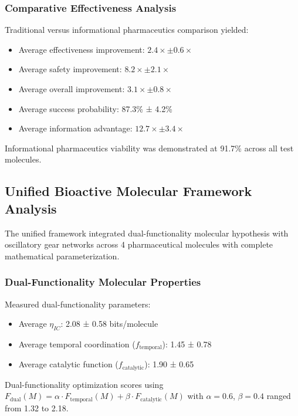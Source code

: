 \documentclass[12pt,a4paper]{article}
\begin{document}
\subsubsection{Comparative Effectiveness Analysis}

Traditional versus informational pharmaceutics comparison yielded:
\begin{itemize}
\item Average effectiveness improvement: $2.4 \times \pm 0.6 \times$
\item Average safety improvement: $8.2 \times \pm 2.1 \times$
\item Average overall improvement: $3.1 \times \pm 0.8 \times$
\item Average success probability: 87.3\% ± 4.2\%
\item Average information advantage: $12.7 \times \pm 3.4 \times$
\end{itemize}

Informational pharmaceutics viability was demonstrated at 91.7\% across all test molecules.

\subsection{Unified Bioactive Molecular Framework Analysis}

The unified framework integrated dual-functionality molecular hypothesis with oscillatory gear networks across 4 pharmaceutical molecules with complete mathematical parameterization.

\subsubsection{Dual-Functionality Molecular Properties}

Measured dual-functionality parameters:
\begin{itemize}
\item Average $\eta_{IC}$: 2.08 ± 0.58 bits/molecule
\item Average temporal coordination ($f_{\text{temporal}}$): 1.45 ± 0.78
\item Average catalytic function ($f_{\text{catalytic}}$): 1.90 ± 0.65
\end{itemize}

Dual-functionality optimization scores using $F_{\text{dual}}(M) = \alpha \cdot F_{\text{temporal}}(M) + \beta \cdot F_{\text{catalytic}}(M)$ with $\alpha = 0.6$, $\beta = 0.4$ ranged from 1.32 to 2.18.
\end{document}
